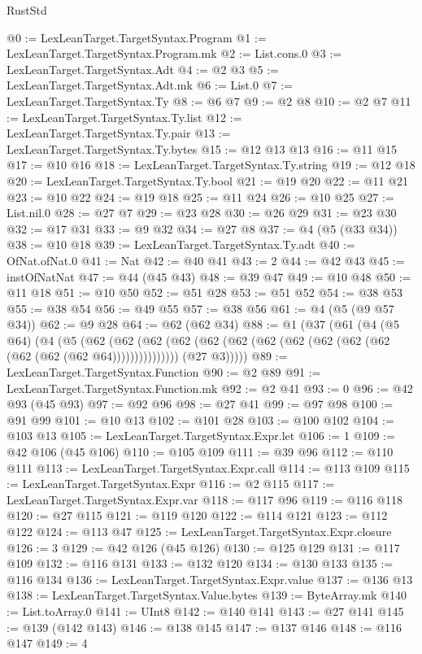 \begin{lexlean}{RustStd}
\begin{coremodule}
@0 := LexLeanTarget.TargetSyntax.Program
@1 := LexLeanTarget.TargetSyntax.Program.mk
@2 := List.cons.{0}
@3 := LexLeanTarget.TargetSyntax.Adt
@4 := @2 @3
@5 := LexLeanTarget.TargetSyntax.Adt.mk
@6 := List.{0}
@7 := LexLeanTarget.TargetSyntax.Ty
@8 := @6 @7
@9 := @2 @8
@10 := @2 @7
@11 := LexLeanTarget.TargetSyntax.Ty.list
@12 := LexLeanTarget.TargetSyntax.Ty.pair
@13 := LexLeanTarget.TargetSyntax.Ty.bytes
@15 := @12 @13 @13
@16 := @11 @15
@17 := @10 @16
@18 := LexLeanTarget.TargetSyntax.Ty.string
@19 := @12 @18
@20 := LexLeanTarget.TargetSyntax.Ty.bool
@21 := @19 @20
@22 := @11 @21
@23 := @10 @22
@24 := @19 @18
@25 := @11 @24
@26 := @10 @25
@27 := List.nil.{0}
@28 := @27 @7
@29 := @23 @28
@30 := @26 @29
@31 := @23 @30
@32 := @17 @31
@33 := @9 @32
@34 := @27 @8
@37 := @4 (@5 (@33 @34))
@38 := @10 @18
@39 := LexLeanTarget.TargetSyntax.Ty.adt
@40 := OfNat.ofNat.{0}
@41 := Nat
@42 := @40 @41
@43 := 2
@44 := @42 @43
@45 := instOfNatNat
@47 := @44 (@45 @43)
@48 := @39 @47
@49 := @10 @48
@50 := @11 @18
@51 := @10 @50
@52 := @51 @28
@53 := @51 @52
@54 := @38 @53
@55 := @38 @54
@56 := @49 @55
@57 := @38 @56
@61 := @4 (@5 (@9 @57 @34))
@62 := @9 @28
@64 := @62 (@62 @34)
@88 := @1
    (@37
      (@61
        (@4
          (@5 @64)
          (@4
            (@5
              (@62
                (@62 (@62 (@62 (@62 (@62 (@62 (@62 (@62 (@62 (@62 (@62 (@62 (@62 @64)))))))))))))))
            (@27 @3)))))
@89 := LexLeanTarget.TargetSyntax.Function
@90 := @2 @89
@91 := LexLeanTarget.TargetSyntax.Function.mk
@92 := @2 @41
@93 := 0
@96 := @42 @93 (@45 @93)
@97 := @92 @96
@98 := @27 @41
@99 := @97 @98
@100 := @91 @99
@101 := @10 @13
@102 := @101 @28
@103 := @100 @102
@104 := @103 @13
@105 := LexLeanTarget.TargetSyntax.Expr.let
@106 := 1
@109 := @42 @106 (@45 @106)
@110 := @105 @109
@111 := @39 @96
@112 := @110 @111
@113 := LexLeanTarget.TargetSyntax.Expr.call
@114 := @113 @109
@115 := LexLeanTarget.TargetSyntax.Expr
@116 := @2 @115
@117 := LexLeanTarget.TargetSyntax.Expr.var
@118 := @117 @96
@119 := @116 @118
@120 := @27 @115
@121 := @119 @120
@122 := @114 @121
@123 := @112 @122
@124 := @113 @47
@125 := LexLeanTarget.TargetSyntax.Expr.closure
@126 := 3
@129 := @42 @126 (@45 @126)
@130 := @125 @129
@131 := @117 @109
@132 := @116 @131
@133 := @132 @120
@134 := @130 @133
@135 := @116 @134
@136 := LexLeanTarget.TargetSyntax.Expr.value
@137 := @136 @13
@138 := LexLeanTarget.TargetSyntax.Value.bytes
@139 := ByteArray.mk
@140 := List.toArray.{0}
@141 := UInt8
@142 := @140 @141
@143 := @27 @141
@145 := @139 (@142 @143)
@146 := @138 @145
@147 := @137 @146
@148 := @116 @147
@149 := 4

\end{coremodule}
\end{lexlean}
